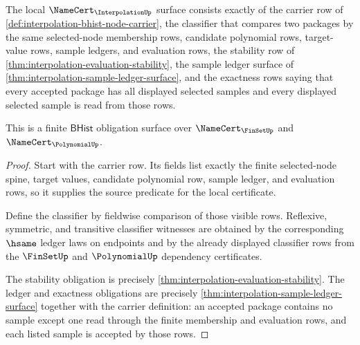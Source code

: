 \begin{theorem}
\label{thm:interpolation-namecert-obligation-surface}
The local $\NameCert_{\InterpolationUp}$ surface consists exactly of the
carrier row of \autoref{def:interpolation-bhist-node-carrier}, the classifier
that compares two packages by the same selected-node membership rows, candidate
polynomial rows, target-value rows, sample ledgers, and evaluation rows, the
stability row of \autoref{thm:interpolation-evaluation-stability}, the sample
ledger surface of \autoref{thm:interpolation-sample-ledger-surface}, and the
exactness rows saying that every accepted package has all displayed selected
samples and every displayed selected sample is read from those rows.

This is a finite $\mathsf{BHist}$ obligation surface over
$\NameCert_{\FinSetUp}$ and $\NameCert_{\PolynomialUp}$.
\end{theorem}
\begin{proof}
Start with the carrier row. Its fields list exactly the finite selected-node
spine, target values, candidate polynomial row, sample ledger, and evaluation
rows, so it supplies the source predicate for the local certificate.

Define the classifier by fieldwise comparison of those visible rows. Reflexive,
symmetric, and transitive classifier witnesses are obtained by the corresponding
$\hsame$ ledger laws on endpoints and by the already displayed classifier rows
from the $\FinSetUp$ and $\PolynomialUp$ dependency certificates.

The stability obligation is precisely
\autoref{thm:interpolation-evaluation-stability}. The ledger and exactness
obligations are precisely
\autoref{thm:interpolation-sample-ledger-surface} together with the carrier
definition: an accepted package contains no sample except one read through the
finite membership and evaluation rows, and each listed sample is accepted by
those rows.
\end{proof}

